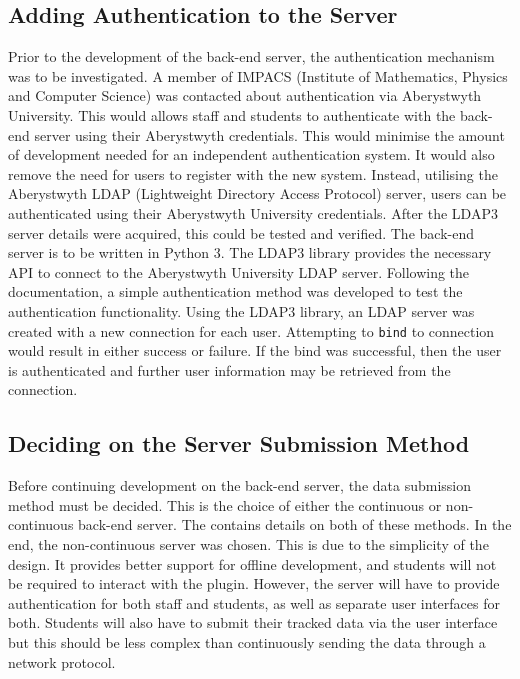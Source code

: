 \subsection{Adding Authentication to the Server}
Prior to the development of the back-end server, the authentication mechanism was to be investigated. A member of IMPACS (Institute of Mathematics, Physics and Computer Science) was contacted about authentication via Aberystwyth University. This would allows staff and students to authenticate with the back-end server using their Aberystwyth credentials. This would minimise the amount of development needed for an independent authentication system. It would also remove the need for users to register with the new system. Instead, utilising the Aberystwyth LDAP (Lightweight Directory Access Protocol) server, users can be authenticated using their Aberystwyth University credentials. After the LDAP3 server details were acquired, this could be tested and verified. The back-end server is to be written in Python 3. The LDAP3 library provides the necessary API to connect to the Aberystwyth University LDAP server\cite{LDAP3Docs}. Following the documentation, a simple authentication method was developed to test the authentication functionality. Using the LDAP3 library, an LDAP server was created with a new connection for each user. Attempting to \texttt{bind} to connection would result in either success or failure. If the bind was successful, then the user is authenticated and further user information may be retrieved from the connection.

\subsection{Deciding on the Server Submission Method}
Before continuing development on the back-end server, the data submission method must be decided. This is the choice of either the continuous or non-continuous back-end server. The  contains details on both of these methods. In the end, the non-continuous server was chosen. This is due to the simplicity of the design. It provides better support for offline development, and students will not be required to interact with the plugin. However, the server will have to provide authentication for both staff and students, as well as separate user interfaces for both. Students will also have to submit their tracked data via the user interface but this should be less complex than continuously sending the data through a network protocol.

